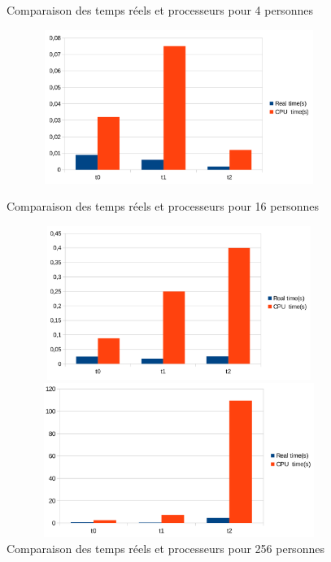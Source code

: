 \documentclass[11pt]{article} %
\begin{document}
\begin{figure}[h]
  \centering
\caption{Comparaison des temps réels et processeurs pour 4 personnes}

\includegraphics[width=12cm, height=5cm]{p4}

 \caption{Comparaison des temps réels et processeurs pour 16 personnes}

\includegraphics[width=12cm,height=5cm]{p16}

 \caption{Comparaison des temps réels et processeurs pour 256 personnes}

\includegraphics[width=12cm,height=5cm]{p256}
\end{figure}
\end{document}
